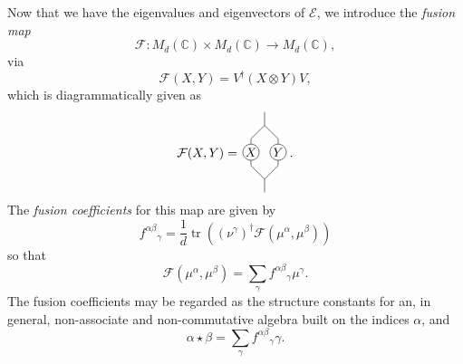 \documentclass[11pt,oneside]{amsart}
\DeclareMathOperator{\tr}{tr}
\theoremstyle{plain}%
\theoremstyle{definition}
\theoremstyle{remark}
\begin{document}
Now that we have the eigenvalues and eigenvectors of $\mathcal{E}$, we introduce the \emph{fusion map}
\begin{equation}
	\mathcal{F}\colon M_d(\mathbb{C})\times M_d(\mathbb{C}) \rightarrow M_d(\mathbb{C}),
\end{equation}
via
\begin{equation}
	\mathcal{F}(X, Y) = V^\dag(X\otimes Y)V,
\end{equation}
which is diagrammatically given as
\begin{equation}
	\mathcal{F}(X, Y) =\tikz[baseline=28.34pt, scale=0.75]{
      \draw (0.0, 1.0) -- (0.0, 1.2);
      \draw (0.0, 1.5) circle [radius=0.3] node {$X$};
      \draw (0.0, 1.8) -- (0.0, 2.0);
      \draw (1.0, 1.0) -- (1.0, 1.2);
      \draw (1.0, 1.5) circle [radius=0.3] node {$Y$};
      \draw (1.0, 1.8) -- (1.0, 2.0);
      \draw (0.0, 1.0) -- (0.5, 0.5) -- (1.0, 1.0);
      \draw (0.5, 0.0) -- (0.5, 0.5);
      \draw (0.0, 2.0) -- (0.5, 2.5) -- (1.0, 2.0);
      \draw (0.5, 2.5) -- (0.5, 3.0);
    }\, .
\end{equation}
The \emph{fusion coefficients} for this map are given by
\begin{equation}
	{f^{\alpha\beta}}_\gamma = \frac{1}{d}\tr\left((\nu^\gamma)^\dag \mathcal{F}(\mu^\alpha, \mu^\beta)\right)
\end{equation}
so that
\begin{equation}
	\mathcal{F}(\mu^\alpha, \mu^\beta) = \sum_{\gamma} {f^{\alpha\beta}}_\gamma \mu^\gamma.
\end{equation}
The fusion coefficients may be regarded as the structure constants for an, in general, non-associate and non-commutative algebra built on the indices $\alpha$, and
\begin{equation}
	\alpha \star \beta = \sum_{\gamma} {f^{\alpha\beta}}_\gamma \gamma.
\end{equation}
\end{document}
